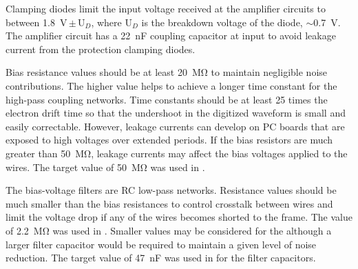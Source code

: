 Clamping diodes limit the input voltage received at the amplifier circuits to between \SI{1.8}{V}\,$\pm$\,U$_D$, where U$_D$
is the breakdown voltage of the diode, $\sim$\SI{0.7}{V}.
The amplifier circuit has a \SI{22}{nF} coupling capacitor at input to avoid leakage current from the protection clamping diodes. 


Bias resistance values should be at least \SI{20}{\mega\ohm} to maintain negligible noise contributions.
The higher value helps to achieve a longer time constant for the high-pass coupling networks.
Time constants should be at least \num{25} times the electron drift time so that the undershoot in the digitized waveform
is small and easily correctable.
However, leakage currents can develop on PC boards that are exposed to high voltages over extended periods.
If the bias resistors are much greater than \SI{50}{\mega\ohm}, leakage currents may affect the bias voltages applied to the wires. The target value of \SI{50}{\mega\ohm} was used in .

The bias-voltage filters are RC low-pass networks.
Resistance values should be much smaller than the bias resistances to control crosstalk between wires
and limit the voltage drop if any of the wires becomes shorted to the  frame.
The value of \SI{2.2}{\mega\ohm} was used in .
Smaller values may be considered for %
the  although a larger filter capacitor would be required to maintain a given level of noise reduction.
The target value of \SI{47}{nF} was used in  for the filter capacitors.


